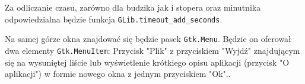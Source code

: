 \documentclass[11pt]{article}
\begin{document}
    Za odliczanie czasu, zarówno dla budzika jak i stopera oraz minutnika odpowiedzialna będzie funkcja \texttt{GLib.timeout\_add\_seconds}.

    Na samej górze okna znajdować się będzie pasek \texttt{Gtk.Menu}. Będzie on oferował dwa elementy \texttt{Gtk.MenuItem}:
    Przycisk "Plik" z przyciskiem "Wyjdź" znajdującym się na wysuniętej liście lub wyświetlenie krótkiego opisu aplikacji (przycisk "O aplikacji")
    w formie nowego okna z jednym przyciskiem "Ok"..
\end{document}
